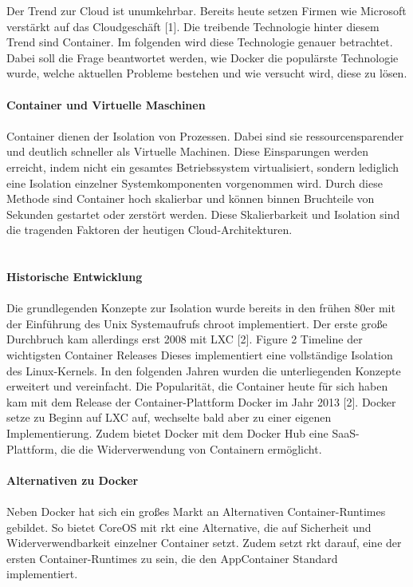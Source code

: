 \begin{multicols}{2}
Der Trend zur Cloud ist unumkehrbar. Bereits heute setzen Firmen wie Microsoft verstärkt auf das Cloudgeschäft [1]. Die treibende Technologie hinter diesem Trend sind Container. Im folgenden wird diese Technologie genauer betrachtet. Dabei soll die Frage beantwortet werden, wie Docker die populärste Technologie wurde, welche aktuellen Probleme bestehen und wie versucht wird, diese zu lösen.
\\
\\ \textbf{Container und Virtuelle Maschinen}
\\
\\
Container dienen der Isolation von Prozessen. Dabei sind sie ressourcensparender und deutlich schneller als Virtuelle Machinen. Diese Einsparungen werden erreicht, indem nicht ein gesamtes Betriebssystem virtualisiert, sondern lediglich eine Isolation einzelner Systemkomponenten vorgenommen wird.
\bildbreit
\bildI
\bildschmal
Durch diese Methode sind Container hoch skalierbar und können binnen Bruchteile von Sekunden gestartet oder zerstört werden. Diese Skalierbarkeit und Isolation sind die tragenden Faktoren der heutigen Cloud-Architekturen.
\\
\\
\\
\textbf{Historische Entwicklung}
\\
\\
Die grundlegenden Konzepte zur Isolation wurde bereits in den frühen 80er mit der Einführung des Unix Systemaufrufs chroot implementiert. Der erste große Durchbruch kam allerdings erst 2008 mit LXC [2]. Figure 2 Timeline der wichtigsten Container Releases
\bildbreit
\bildII
\bildschmal
Dieses implementiert eine vollständige Isolation des Linux-Kernels. In den folgenden Jahren wurden die unterliegenden Konzepte erweitert und vereinfacht. Die Popularität, die Container heute für sich haben kam mit dem Release der Container-Plattform Docker im Jahr 2013 [2].
Docker setze zu Beginn auf LXC auf, wechselte bald aber zu einer eigenen Implementierung. Zudem bietet Docker mit dem Docker Hub eine SaaS-Plattform, die die Widerverwendung von Containern ermöglicht. 
\\
\\ \textbf{Alternativen zu Docker}
\\
\\
Neben Docker hat sich ein großes Markt an Alternativen Container-Runtimes gebildet. So bietet CoreOS mit rkt eine Alternative, die auf Sicherheit und Widerverwendbarkeit einzelner Container setzt. Zudem setzt rkt darauf, eine der ersten Container-Runtimes zu sein, die den AppContainer Standard implementiert.

\end{multicols}
